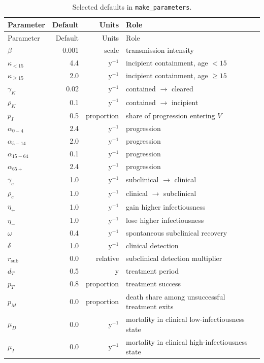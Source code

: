 \documentclass[11pt]{article}
\newcommand{\code}[1]{\texttt{#1}}
\begin{document}
\begin{longtable}{>{\raggedright\arraybackslash}p{}rr>{\raggedright\arraybackslash}p{}}
\caption{Selected defaults in \code{make\_parameters}.}\label{tab:defaults}\\
\toprule
Parameter & Default & Units & Role\\
\midrule
\endfirsthead
\toprule
Parameter & Default & Units & Role\\
\midrule
\endhead
$\beta$ & 0.001 & scale & transmission intensity\\
$\kappa_{<15}$ & 4.4 & y$^{-1}$ & incipient containment, age $<15$\\
$\kappa_{\ge15}$ & 2.0 & y$^{-1}$ & incipient containment, age $\ge15$\\
$\gamma_K$ & 0.02 & y$^{-1}$ & contained $\to$ cleared\\
$\rho_K$ & 0.1 & y$^{-1}$ & contained $\to$ incipient\\
$p_I$ & 0.5 & proportion & share of progression entering $V$\\
$\alpha_{0-4}$ & 2.4 & y$^{-1}$ & progression\\
$\alpha_{5-14}$ & 2.0 & y$^{-1}$ & progression\\
$\alpha_{15-64}$ & 0.1 & y$^{-1}$ & progression\\
$\alpha_{65+}$ & 2.4 & y$^{-1}$ & progression\\
$\gamma_c$ & 1.0 & y$^{-1}$ & subclinical $\to$ clinical\\
$\rho_c$ & 1.0 & y$^{-1}$ & clinical $\to$ subclinical\\
$\eta_+$ & 1.0 & y$^{-1}$ & gain higher infectiousness\\
$\eta_-$ & 1.0 & y$^{-1}$ & lose higher infectiousness\\
$\omega$ & 0.4 & y$^{-1}$ & spontaneous subclinical recovery\\
$\delta$ & 1.0 & y$^{-1}$ & clinical detection\\
$r_{\mathrm{sub}}$ & 0.0 & relative & subclinical detection multiplier\\
$d_T$ & 0.5 & y & treatment period\\
$p_T$ & 0.8 & proportion & treatment success\\
$p_M$ & 0.0 & proportion & death share among unsuccessful treatment exits\\
$\mu_D$ & 0.0 & y$^{-1}$ & mortality in clinical low-infectiousness state\\
$\mu_I$ & 0.0 & y$^{-1}$ & mortality in clinical high-infectiousness state\\
\bottomrule
\end{longtable}
\end{document}
